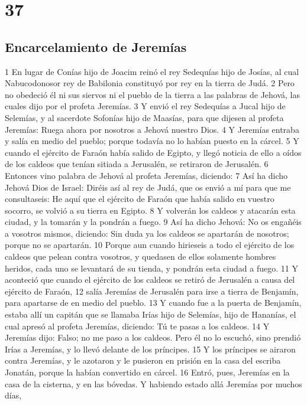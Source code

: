 \chapter{37}

\section*{Encarcelamiento de Jeremías}

1 En lugar de Conías hijo de Joacim reinó el rey Sedequías hijo de Josías, al cual Nabucodonosor rey de Babilonia constituyó por rey en la tierra de Judá. 
2 Pero no obedeció él ni sus siervos ni el pueblo de la tierra a las palabras de Jehová, las cuales dijo por el profeta Jeremías.
3 Y envió el rey Sedequías a Jucal hijo de Selemías, y al sacerdote Sofonías hijo de Maasías, para que dijesen al profeta Jeremías: Ruega ahora por nosotros a Jehová nuestro Dios.
4 Y Jeremías entraba y salía en medio del pueblo; porque todavía no lo habían puesto en la cárcel.
5 Y cuando el ejército de Faraón había salido de Egipto, y llegó noticia de ello a oídos de los caldeos que tenían sitiada a Jerusalén, se retiraron de Jerusalén.
6 Entonces vino palabra de Jehová al profeta Jeremías, diciendo:
7 Así ha dicho Jehová Dios de Israel: Diréis así al rey de Judá, que os envió a mí para que me consultaseis: He aquí que el ejército de Faraón que había salido en vuestro socorro, se volvió a su tierra en Egipto. 
8 Y volverán los caldeos y atacarán esta ciudad, y la tomarán y la pondrán a fuego.
9 Así ha dicho Jehová: No os engañéis a vosotros mismos, diciendo: Sin duda ya los caldeos se apartarán de nosotros; porque no se apartarán.
10 Porque aun cuando hirieseis a todo el ejército de los caldeos que pelean contra vosotros, y quedasen de ellos solamente hombres heridos, cada uno se levantará de su tienda, y pondrán esta ciudad a fuego.
11 Y aconteció que cuando el ejército de los caldeos se retiró de Jerusalén a causa del ejército de Faraón,
12 salía Jeremías de Jerusalén para irse a tierra de Benjamín, para apartarse de en medio del pueblo.
13 Y cuando fue a la puerta de Benjamín, estaba allí un capitán que se llamaba Irías hijo de Selemías, hijo de Hananías, el cual apresó al profeta Jeremías, diciendo: Tú te pasas a los caldeos.
14 Y Jeremías dijo: Falso; no me paso a los caldeos. Pero él no lo escuchó, sino prendió Irías a Jeremías, y lo llevó delante de los príncipes.
15 Y los príncipes se airaron contra Jeremías, y le azotaron y le pusieron en prisión en la casa del escriba Jonatán, porque la habían convertido en cárcel.
16 Entró, pues, Jeremías en la casa de la cisterna, y en las bóvedas. Y habiendo estado allá Jeremías por muchos días,
